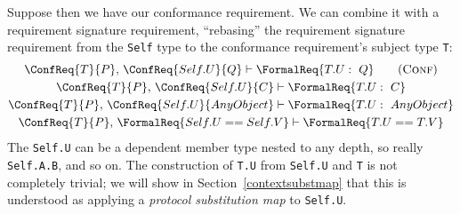 \documentclass[../generics]{subfiles}
\begin{document}
 Suppose then we have our conformance requirement. We can combine it with a requirement signature requirement, ``rebasing'' the requirement signature requirement from the \texttt{Self} type to the conformance requirement's subject type \texttt{T}:
\begin{gather*}
\ConfReq{T}{P},\,\ConfReq{Self.U}{Q}\vdash\FormalReq{T.U:~Q}\tag{\textsc{Conf}}\\
\ConfReq{T}{P},\,\ConfReq{Self.U}{C}\vdash\FormalReq{T.U:~C}\\
\ConfReq{T}{P},\,\ConfReq{Self.U}{AnyObject}\vdash\FormalReq{T.U:~AnyObject}\\
\ConfReq{T}{P},\,\FormalReq{Self.U == Self.V}\vdash\FormalReq{T.U == T.V}
\end{gather*}
The \texttt{Self.U} can be a dependent member type nested to any depth, so really \texttt{Self.A.B}, and so on. The construction of \texttt{T.U} from \texttt{Self.U} and \texttt{T} is not completely trivial; we will show in Section~\ref{contextsubstmap} that this is understood as applying a \emph{protocol substitution map} to \texttt{Self.U}.
\end{document}
